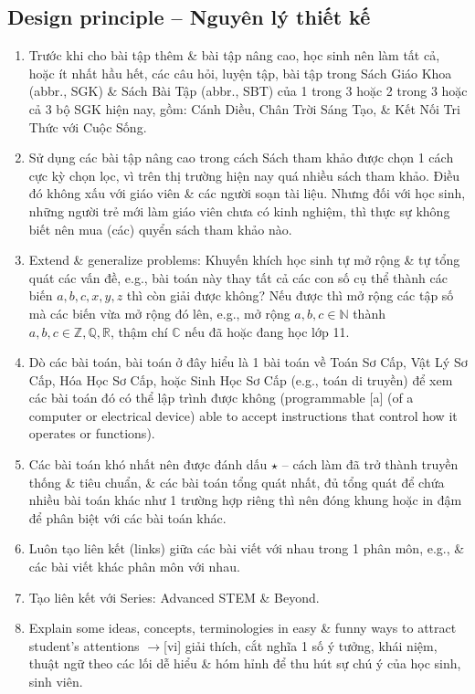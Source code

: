 \documentclass[12pt,twoside]{book}
\begin{document}
\subsection{Design principle -- Nguyên lý thiết kế}

\begin{enumerate}
	\item Trước khi cho bài tập thêm \& bài tập nâng cao, học sinh nên làm tất cả, hoặc ít nhất hầu hết, các câu hỏi, luyện tập, bài tập trong Sách Giáo Khoa (abbr., SGK) \& Sách Bài Tập (abbr., SBT) của 1 trong 3 hoặc 2 trong 3 hoặc cả 3 bộ SGK hiện nay, gồm: Cánh Diều, Chân Trời Sáng Tạo, \& Kết Nối Tri Thức với Cuộc Sống.
	\item Sử dụng các bài tập nâng cao trong cách Sách tham khảo được chọn 1 cách cực kỳ chọn lọc, vì trên thị trường hiện nay quá nhiều sách tham khảo. Điều đó không xấu với giáo viên \& các người soạn tài liệu. Nhưng đối với học sinh, những người trẻ mới làm giáo viên chưa có kinh nghiệm, thì thực sự không biết nên mua (các) quyển sách tham khảo nào.
	\item Extend \& generalize problems: Khuyến khích học sinh tự mở rộng \& tự tổng quát các vấn đề, e.g., bài toán này thay tất cả các con số cụ thể thành các biến $a,b,c,x,y,z$ thì còn giải được không? Nếu được thì mở rộng các tập số mà các biến vừa mở rộng đó lên, e.g., mở rộng $a,b,c\in\mathbb{N}$ thành $a,b,c\in\mathbb{Z},\mathbb{Q},\mathbb{R}$, thậm chí $\mathbb{C}$ nếu đã hoặc đang học lớp 11.
	\item Dò các bài toán, bài toán ở đây hiểu là 1 bài toán về Toán Sơ Cấp, Vật Lý Sơ Cấp, Hóa Học Sơ Cấp, hoặc Sinh Học Sơ Cấp (e.g., toán di truyền) để xem các bài toán đó có thể lập trình được không (programmable [a] {\sf (of a computer or electrical device) able to accept instructions that control how it operates or functions}).
	\item Các bài toán khó nhất nên được đánh dấu $\star$ -- cách làm đã trở thành truyền thống \& tiêu chuẩn, \& các bài toán tổng quát nhất, đủ tổng quát để chứa nhiều bài toán khác như 1 trường hợp riêng thì nên đóng khung hoặc in đậm để phân biệt với các bài toán khác.
	\item Luôn tạo liên kết (links) giữa các bài viết với nhau trong 1 phân môn, e.g., \& các bài viết khác phân môn với nhau.
	\item Tạo liên kết với Series: Advanced STEM \& Beyond.
	\item Explain some ideas, concepts, terminologies in easy \& funny ways to attract student's attentions {\sf[en]$\to$[vi]} giải thích, cắt nghĩa 1 số ý tưởng, khái niệm, thuật ngữ theo các lối dễ hiểu \& hóm hỉnh để thu hút sự chú ý của học sinh, sinh viên.
\end{enumerate}
\end{document}
